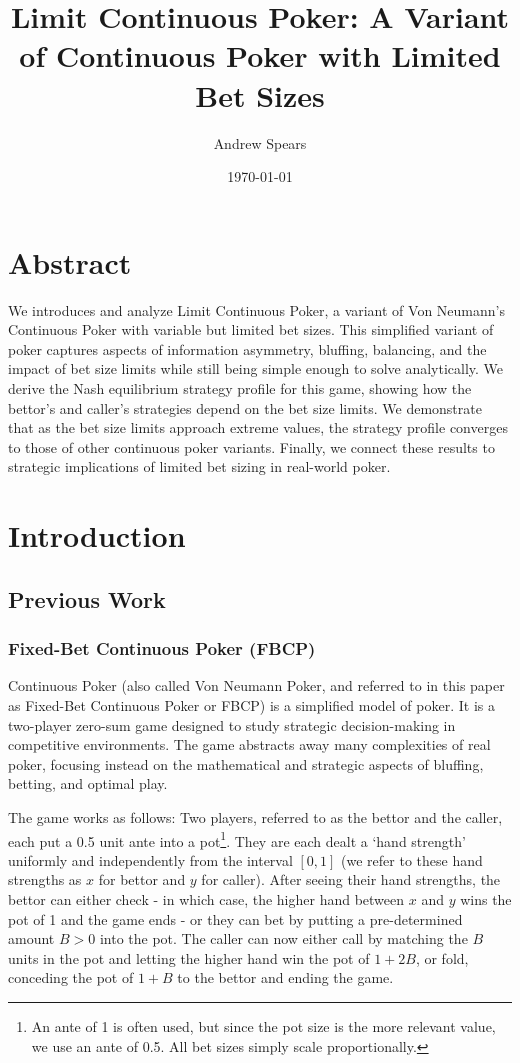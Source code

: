 \documentclass[a4paper,12pt]{article}
\title{Limit Continuous Poker: A Variant of Continuous Poker with Limited Bet Sizes}
\author{Andrew Spears}
\date{\today}
\theoremstyle{plain}
\theoremstyle{definition}
\begin{document}
\maketitle

\section{Abstract}
We introduces and analyze Limit Continuous Poker, a variant of Von Neumann's Continuous Poker with variable but limited bet sizes. This simplified variant of poker captures aspects of information asymmetry, bluffing, balancing, and the impact of bet size limits while still being simple enough to solve analytically. We derive the Nash equilibrium strategy profile for this game, showing how the bettor's and caller's strategies depend on the bet size limits. We demonstrate that as the bet size limits approach extreme values, the strategy profile converges to those of other continuous poker variants. Finally, we connect these results to strategic implications of limited bet sizing in real-world poker.

\section{Introduction}

\subsection{Previous Work}

\subsubsection{Fixed-Bet Continuous Poker (FBCP)}

Continuous Poker (also called Von Neumann Poker, and referred to in this paper as Fixed-Bet Continuous Poker or FBCP) is a simplified model of poker. It is a two-player zero-sum game designed to study strategic decision-making in competitive environments. The game abstracts away many complexities of real poker, focusing instead on the mathematical and strategic aspects of bluffing, betting, and optimal play.

The game works as follows: Two players, referred to as the bettor and the caller, each put a 0.5 unit ante into a pot\footnote{An ante of 1 is often used, but since the pot size is the more relevant value, we use an ante of 0.5. All bet sizes simply scale proportionally.}. They are each dealt a `hand strength' uniformly and independently from the interval $[0, 1]$ (we refer to these hand strengths as $x$ for bettor and $y$ for caller). After seeing their hand strengths, the bettor can either check - in which case, the higher hand between $x$ and $y$ wins the pot of 1 and the game ends - or they can bet by putting a pre-determined amount $B > 0$ into the pot. The caller can now either call by matching the $B$ units in the pot and letting the higher hand win the pot of $1+2B$, or fold, conceding the pot of $1+B$ to the bettor and ending the game.
\end{document}
